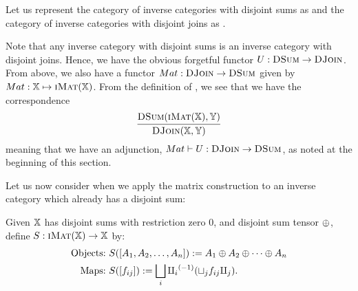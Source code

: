 Let us represent the category of inverse categories with disjoint sums as \DSum and the
category of inverse categories with disjoint joins as \DJoin.

Note that any inverse category with disjoint sums is an inverse category with disjoint joins. Hence,
we have the obvious forgetful functor $U:\textsc{DSum} \to \textsc{DJoin}$. From above, we also have a functor
$Mat:\textsc{DJoin} \to \textsc{DSum}$ given by $Mat: \mathbb{X} \mapsto \textsc{iMat}({\mathbb{X}})$. From the definition of \imatx, we see
that we have the correspondence
\[
  \infer{\DJoin(\X,\Y)}{\DSum(\imatx,\Y)}
\]
meaning that we have an adjunction, $Mat\vdash U:\textsc{DJoin} \to \textsc{DSum}$, as noted at the beginning
of this section.

Let us now consider when we apply the matrix construction to an inverse category which already has a
disjoint sum:

\begin{definition}\label{def:functor_from_imatx_to_x}
  Given $\mathbb{X}$ has disjoint sums with restriction zero $0$,
  and disjoint sum tensor $\oplus$, define $S:\textsc{iMat}({\mathbb{X}}) \to \mathbb{X}$ by:
  \begin{align*}
    \text{Objects:}\ &S([A_1,A_2, \ldots, A_n]) := A_1\oplus A_2\oplus\cdots\oplus A_n\\
    \text{Maps:}\ &S([f_{ij}]) := \bigsqcup_i {\amalg_{i}}^{(-1)} (\sqcup_j f_{ij} \amalg_{j}).
  \end{align*}
\end{definition}

